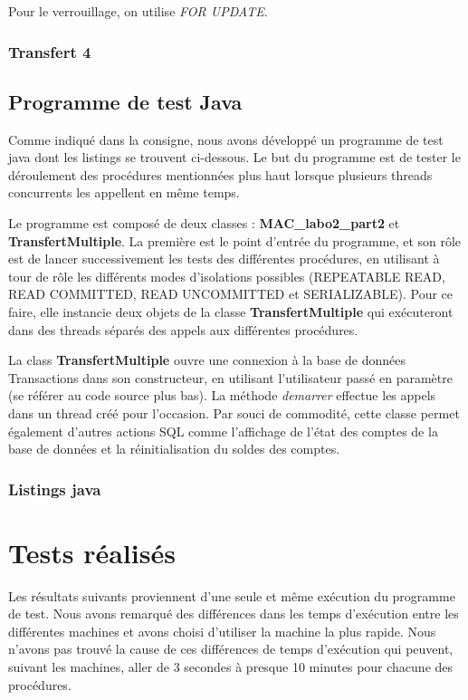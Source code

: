 \documentclass[11pt, a4paper, french, twoside]{article}
\begin{document}
    Pour le verrouillage, on utilise \textit{FOR UPDATE}.
    
    
    
    \subsubsection*{Transfert 4}
    
    \subsection{Programme de test Java}
    Comme indiqué dans la consigne, nous avons développé un programme de test java dont les listings se trouvent ci-dessous. Le but du programme est de tester le déroulement des procédures mentionnées plus haut lorsque plusieurs threads concurrents les appellent en même temps.
    
    Le programme est composé de deux classes : \textbf{MAC\_labo2\_part2} et \textbf{TransfertMultiple}. La première est le point d'entrée du programme, et son rôle est de lancer successivement les tests des différentes procédures, en utilisant à tour de rôle les différents modes d'isolations possibles (REPEATABLE READ, READ COMMITTED, READ UNCOMMITTED et SERIALIZABLE). Pour ce faire, elle instancie deux objets de la classe \textbf{TransfertMultiple} qui exécuteront dans des threads séparés des appels aux différentes procédures. 
    
    La class \textbf{TransfertMultiple} ouvre une connexion à la base de données Transactions dans son constructeur, en utilisant l'utilisateur passé en paramètre (se référer au code source plus bas). La méthode \textit{demarrer} effectue les appels dans un thread créé pour l'occasion. Par souci de commodité, cette classe permet également d'autres actions SQL comme l'affichage de l'état des comptes de la base de données et la réinitialisation du soldes des comptes. 
    
    \subsubsection{Listings java}
    
     
    
    
	\section{Tests réalisés}
	Les résultats suivants proviennent d'une seule et même exécution du programme de test. Nous avons remarqué des différences dans les temps d'exécution entre les différentes machines et avons choisi d'utiliser la machine la plus rapide. Nous n'avons pas trouvé la cause de ces différences de temps d'exécution qui peuvent, suivant les machines, aller de 3 secondes à presque 10 minutes pour chacune des procédures.
	
\end{document}
